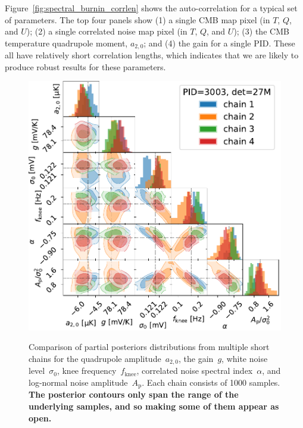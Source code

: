 \documentclass[twocolumn]{aa}%
\begin{document}
Figure~\ref{fig:spectral_burnin_corrlen} shows the auto-correlation for
a typical set of parameters. The top four panels show (1) a single CMB
map pixel (in $T$, $Q$, and $U$); (2) a single correlated noise map
pixel (in $T$, $Q$, and $U$); (3) the CMB temperature quadrupole
moment, $a_{2,0}$; and (4) the gain for a single PID. These all have
relatively short correlation lengths, which indicates that we are
likely to produce robust results for these parameters.


\begin{figure}[t]
    \includegraphics[width=\linewidth]{figs/triangle_chains4_comparison_PID3003_det27M.pdf}\\
    \caption{Comparison of partial posteriors distributions from
      multiple short chains for the quadrupole amplitude~$a_{2,0}$, the
      gain~$g$, white noise level~$\sigma_0$, knee
      frequency~$f_\mathrm{knee}$, correlated noise spectral
      index~$\alpha$, and log-normal noise
      amplitude~$A_\mathrm{p}$.
      Each chain consists of 1000 samples.
      {\bf The posterior contours only span the range of the underlying samples, and so making some of them appear as open.}}
    \label{fig:triangle_chain_comparison}


\end{figure}
\end{document}
